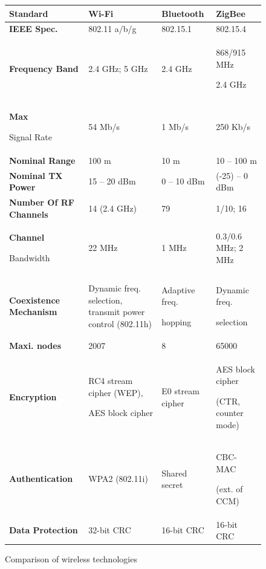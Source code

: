 \begin{figure}
	\begin{center}
		\label{fig:WirelessComparison}
\begin{tabularx}{1\textwidth}{>{\bfseries}p{}||p{}|p{}|p{}}
\hline Standard 			& Wi-Fi & Bluetooth & ZigBee  \\\hline
\hline IEEE Spec. 			& 802.11 a/b/g & 802.15.1  & 802.15.4  \\
\hline Frequency Band 		& 2.4 GHz; 5 GHz & 2.4 GHz & 868/915 MHz\par2.4 GHz  \\
\hline Max \par Signal Rate 		& 54 Mb/s & 1 Mb/s & 250 Kb/s \\
\hline Nominal Range 		& 100 m & 10 m & 10 – 100 m  \\
\hline Nominal TX Power 	& 15 – 20 dBm & 0 – 10 dBm & (-25) – 0 dBm \\
\hline Number Of RF Channels & 14 (2.4 GHz) & 79  &  1/10; 16 \\
\hline Channel \par Bandwidth 	& 22 MHz & 1 MHz  & 0.3/0.6 MHz; 2 MHz \\
\hline Coexistence Mechanism& Dynamic freq. selection, transmit power control (802.11h) & Adaptive freq.\par hopping & Dynamic freq. \par selection  \\
\hline Maxi. nodes & 2007 & 8 & 65000 \\
\hline Encryption 			& RC4 stream cipher (WEP),\par AES block cipher & E0 stream cipher & AES block cipher \par(CTR, counter mode) \\
\hline Authentication 		& WPA2 (802.11i) & Shared secret & CBC-MAC \par(ext. of CCM) \\
\hline Data Protection 		& 32-bit CRC & 16-bit CRC &  16-bit CRC \\
\hline 
\end{tabularx} 
		\caption{Comparison of wireless technologies}
	\end{center}
\end{figure}


